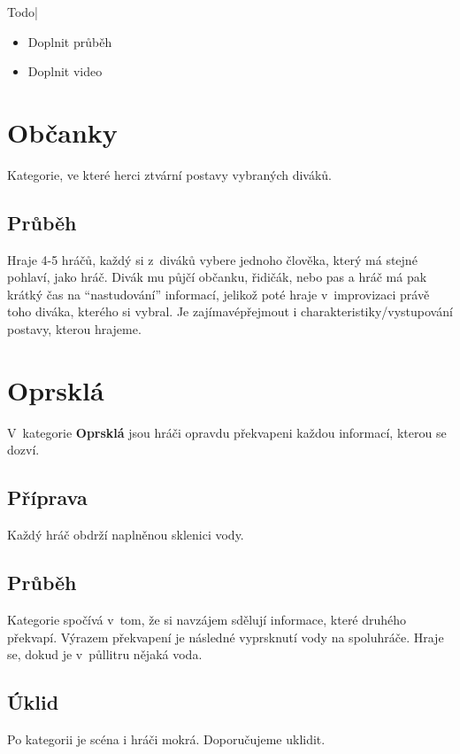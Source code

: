 {{Todo| 
\begin{itemize}
\item  Doplnit průběh
\item  Doplnit video
\end{itemize}
}} 
 
 
 
 
 
\needspace{5cm} \section{Občanky} \label{občanky}  
 
Kategorie, ve které herci ztvární postavy vybraných diváků. 
 
\subsection{Průběh}  
Hraje 4-5 hráčů, každý si z~diváků vybere jednoho člověka, který má stejné pohlaví, jako hráč. Divák mu půjčí občanku, řidičák, nebo pas a hráč má pak krátký čas na “nastudování” informací, jelikož poté hraje v~improvizaci právě toho diváka, kterého si vybral. Je zajímavépřejmout i charakteristiky/vystupování postavy, kterou hrajeme. 
 
 
 
\needspace{5cm} \section{Oprsklá} \label{oprsklá}  
 
V~kategorie \textbf{Oprsklá} jsou hráči opravdu překvapeni každou informací, kterou se dozví. 
 
\subsection{Příprava} Každý hráč obdrží naplněnou sklenici vody.  
 
\subsection{Průběh} Kategorie spočívá v~tom, že si navzájem sdělují informace, které druhého překvapí. Výrazem překvapení je následné vyprsknutí vody na spoluhráče. Hraje se, dokud je v~půllitru nějaká voda.  
 
\subsection{Úklid} Po kategorii je scéna i hráči mokrá. Doporučujeme uklidit. 
 
